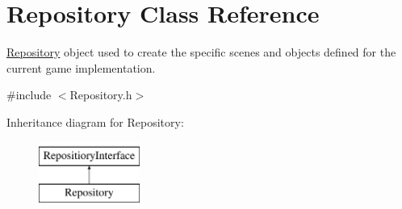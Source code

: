 \hypertarget{class_repository}{}\section{Repository Class Reference}
\label{class_repository}


\hyperlink{class_repository}{Repository} object used to create the specific scenes and objects defined for the current game implementation.  




{\ttfamily \#include $<$Repository.\+h$>$}

Inheritance diagram for Repository\+:\begin{figure}[H]
\begin{center}
\leavevmode
\includegraphics[height=2.000000cm]{da/d12/class_repository}
\end{center}
\end{figure}

